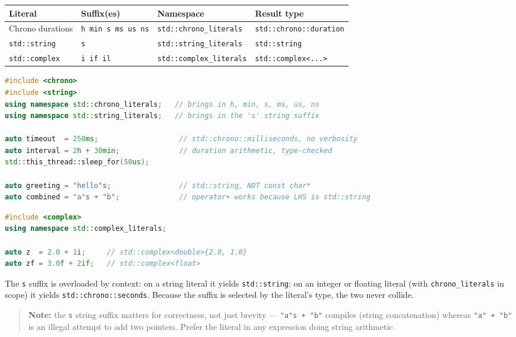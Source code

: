 \begin{center}
\begin{tabular}{llll}
\hline
\textbf{Literal} & \textbf{Suffix(es)} & \textbf{Namespace} & \textbf{Result type} \\
\hline
Chrono durations & \texttt{h min s ms us ns} & \texttt{std::chrono\_literals} & \texttt{std::chrono::duration} \\
\texttt{std::string} & \texttt{s} & \texttt{std::string\_literals} & \texttt{std::string} \\
\texttt{std::complex} & \texttt{i if il} & \texttt{std::complex\_literals} & \texttt{std::complex<...>} \\
\hline
\end{tabular}
\end{center}

\begin{lstlisting}[language=C++,caption={Chrono and string literals}]
#include <chrono>
#include <string>
using namespace std::chrono_literals;   // brings in h, min, s, ms, us, ns
using namespace std::string_literals;   // brings in the 's' string suffix

auto timeout  = 250ms;                   // std::chrono::milliseconds, no verbosity
auto interval = 2h + 30min;              // duration arithmetic, type-checked
std::this_thread::sleep_for(50us);

auto greeting = "hello"s;                // std::string, NOT const char*
auto combined = "a"s + "b";              // operator+ works because LHS is std::string
\end{lstlisting}

\begin{lstlisting}[language=C++,caption={Complex literals}]
#include <complex>
using namespace std::complex_literals;

auto z  = 2.0 + 1i;     // std::complex<double>{2.0, 1.0}
auto zf = 3.0f + 2if;   // std::complex<float>
\end{lstlisting}

The \texttt{s} suffix is overloaded by context: on a string literal it yields \texttt{std::string}; on an integer or floating literal (with \texttt{chrono\_literals} in scope) it yields \texttt{std::chrono::seconds}. Because the suffix is selected by the literal's type, the two never collide.

\begin{quote}
\textbf{Note:} the \texttt{s} string suffix matters for correctness, not just brevity --- \texttt{"a"s + "b"} compiles (string concatenation) whereas \texttt{"a" + "b"} is an illegal attempt to add two pointers. Prefer the literal in any expression doing string arithmetic.
\end{quote}

